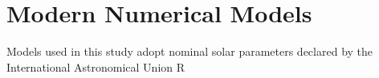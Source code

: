 \section{Modern Numerical Models}
Models used in this study adopt nominal solar parameters declared by the International Astronomical Union R